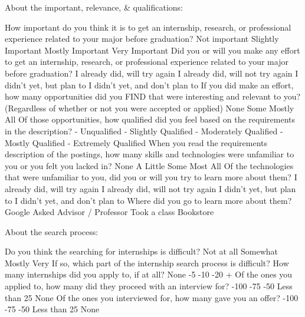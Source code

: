 \documentclass[english]{proposalnsf}
\begin{document}
	About the important, relevance, & qualifications:
\begin{outline}
    \1 How important do you think it is to get an internship, research, or professional experience related to your major before graduation?
        \2[\Square] Not important
        \2[\Square] Slightly Important
        \2[\Square] Mostly Important
        \2[\Square] Very Important
    \1 Did you or will you make any effort to get an internship, research, or professional experience related to your major before graduation?
        \2[\Square] I already did, will try again
        \2[\Square] I already did, will not try again
        \2[\Square] I didn’t yet, but plan to
        \2[\Square] I didn’t yet, and don’t plan to
    \1 If you did make an effort, how many opportunities did you FIND that were interesting and relevant to you? (Regardless of whether or not you were accepted or applied)
        \2[\Square] None
        \2[\Square] Some
        \2[\Square] Mostly
        \2[\Square] All
    \1 Of those opportunities, how qualified did you feel based on the requirements in the description?
         - Unqualified
         - Slightly Qualified
         - Moderately Qualified
         - Mostly Qualified
         - Extremely Qualified
    \1 When you read the requirements description of the postings, how many skills and technologies were unfamiliar to you or you felt you lacked in?
        \2[\Square] None
        \2[\Square] A Little
        \2[\Square] Some
        \2[\Square] Most
        \2[\Square] All
    \1 Of the technologies that were unfamiliar to you, did you or will you try to learn more about them?
        \2[\Square] I already did, will try again
        \2[\Square] I already did, will not try again
        \2[\Square] I didn’t yet, but plan to
        \2[\Square] I didn’t yet, and don’t plan to
    \1 Where did you go to learn more about them?
        \2[\Square] Google
        \2[\Square] Asked Advisor / Professor
        \2[\Square] Took a class
        \2[\Square] Bookstore
\end{outline}

About the search process:
\begin{outline}
    \1 Do you think the searching for internships is difficult?
        \2[\Square] Not at all
        \2[\Square] Somewhat
        \2[\Square] Mostly
        \2[\Square] Very
    \1 If so, which part of the internship search process is difficult?
    \1 How many internships did you apply to, if at all?
        \2[\Square] None
        -5
        -10
        -20
        +
    \1 Of the ones you applied to, how many did they proceed with an interview for?
        -100%
        -75%
        -50%
        \2[\Square] Less than 25%
        \2[\Square] None
    \1 Of the ones you interviewed for, how many gave you an offer?
        -100%
        -75%
        -50%
        \2[\Square] Less than 25%
        \2[\Square] None
\end{outline}
\end{document}
